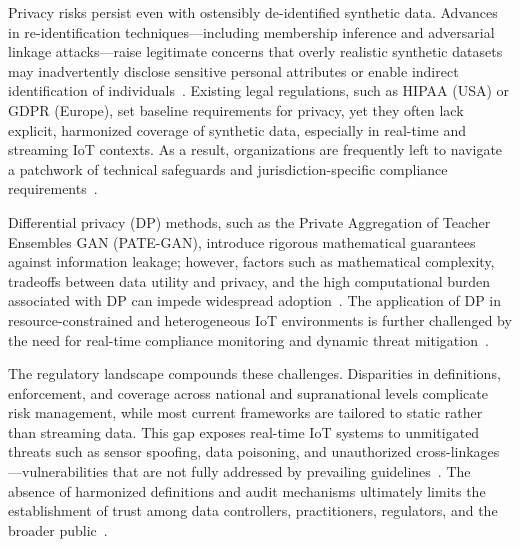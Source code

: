 \documentclass[sigconf]{acmart}
\begin{document}
Privacy risks persist even with ostensibly de-identified synthetic data. Advances in re-identification techniques—including membership inference and adversarial linkage attacks—raise legitimate concerns that overly realistic synthetic datasets may inadvertently disclose sensitive personal attributes or enable indirect identification of individuals~\cite{ref91,ref106}. Existing legal regulations, such as HIPAA (USA) or GDPR (Europe), set baseline requirements for privacy, yet they often lack explicit, harmonized coverage of synthetic data, especially in real-time and streaming IoT contexts. As a result, organizations are frequently left to navigate a patchwork of technical safeguards and jurisdiction-specific compliance requirements~\cite{ref2,ref4,ref5,ref6,ref7,ref8,ref9,ref10,ref24,ref25,ref28,ref30,ref31,ref33,ref34,ref35,ref36,ref41,ref43,ref46,ref50,ref54,ref51,ref61,ref62,ref63,ref64,ref65,ref70,ref71,ref72,ref75,ref76,ref77,ref78,ref79,ref82,ref83,ref84,ref90,ref91}.

Differential privacy (DP) methods, such as the Private Aggregation of Teacher Ensembles GAN (PATE-GAN), introduce rigorous mathematical guarantees against information leakage; however, factors such as mathematical complexity, tradeoffs between data utility and privacy, and the high computational burden associated with DP can impede widespread adoption~\cite{ref91}. The application of DP in resource-constrained and heterogeneous IoT environments is further challenged by the need for real-time compliance monitoring and dynamic threat mitigation~\cite{ref2,ref4,ref5,ref6,ref7,ref8,ref9,ref10,ref24,ref25,ref28,ref30,ref31,ref33,ref34,ref35,ref36,ref41,ref43,ref46,ref50,ref54,ref51,ref61,ref62,ref63,ref64,ref65,ref70,ref71,ref72,ref75,ref76,ref77,ref78,ref79,ref82,ref83,ref84,ref90,ref91}.

The regulatory landscape compounds these challenges. Disparities in definitions, enforcement, and coverage across national and supranational levels complicate risk management, while most current frameworks are tailored to static rather than streaming data. This gap exposes real-time IoT systems to unmitigated threats such as sensor spoofing, data poisoning, and unauthorized cross-linkages—vulnerabilities that are not fully addressed by prevailing guidelines~\cite{ref4,ref5,ref10,ref24,ref25,ref30,ref31,ref33,ref34,ref35,ref36,ref41,ref43,ref46,ref50,ref54,ref61,ref62,ref63,ref64,ref65,ref76,ref77,ref82,ref83,ref84,ref91}. The absence of harmonized definitions and audit mechanisms ultimately limits the establishment of trust among data controllers, practitioners, regulators, and the broader public~\cite{ref91}.
\end{document}
